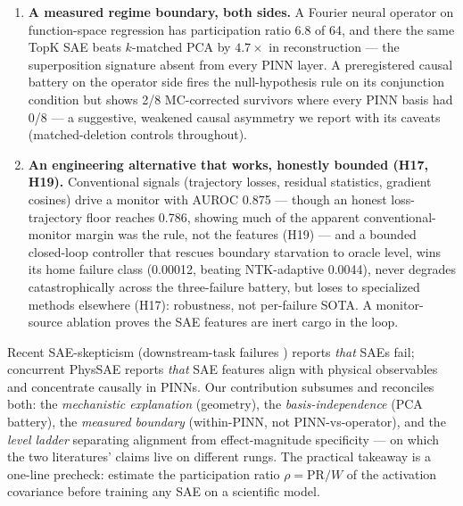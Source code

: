 \documentclass{article}
\newcommand{\PRW}{\rho}
\begin{document}
\begin{enumerate}
{        task} crosses into the higher-rank regime (PR 4.0--5.6,
        FNO-neighborhood) where the same TopK SAE beats $k$-matched PCA
        by 25--56$\times$ (3/3 seeds) --- the boundary is measured
        \emph{within} PINNs, and a preregistered rank diagnostic
        predicted exactly which runs would flip. Fourier features raise
        covariance rank while tangent rank stays 1: the two geometry
        measures dissociate, and covariance rank is the regime
        discriminator.
  \item \textbf{A measured regime boundary, both sides.} A Fourier neural
        operator \cite{li2021fourier} on function-space regression has
        participation ratio 6.8 of 64, and there the same TopK SAE beats
        $k$-matched PCA by $4.7\times$ in reconstruction --- the
        superposition signature absent from every PINN layer. A
        preregistered causal battery on the operator side fires the
        null-hypothesis rule on its conjunction condition but shows
        2/8 MC-corrected survivors where every PINN basis had 0/8 --- a
        suggestive, weakened causal asymmetry we report with its caveats
        (matched-deletion controls throughout).
  \item \textbf{An engineering alternative that works, honestly bounded
        (H17, H19).} Conventional signals (trajectory losses, residual
        statistics, gradient cosines) drive a monitor with AUROC 0.875
        --- though an honest loss-trajectory floor reaches 0.786,
        showing much of the apparent conventional-monitor margin was the
        rule, not the features (H19) --- and a bounded closed-loop
        controller that rescues boundary starvation to oracle level,
        wins its home failure class (0.00012, beating NTK-adaptive
        0.0044), never degrades catastrophically across the three-failure
        battery, but loses to specialized methods elsewhere (H17):
        robustness, not per-failure SOTA. A monitor-source ablation
        proves the SAE features are inert cargo in the loop.
\end{enumerate}

Recent SAE-skepticism (downstream-task failures
\cite{deepmind2025negative,leask2025sparse,paulo2025sae,korznikov2026saes})
reports \emph{that} SAEs fail; concurrent PhysSAE
\cite{patil2026physSAE} reports \emph{that} SAE features align with
physical observables and concentrate causally in PINNs. Our contribution
subsumes and reconciles both: the \emph{mechanistic explanation}
(geometry), the \emph{basis-independence} (PCA battery), the
\emph{measured boundary} (within-PINN, not PINN-vs-operator), and the
\emph{level ladder} separating alignment from effect-magnitude
specificity --- on which the two literatures' claims live on different
rungs. The practical takeaway is a one-line
precheck: estimate the participation ratio $\PRW = \mathrm{PR}/W$ of the
activation covariance before training any SAE on a scientific model.
\end{document}
